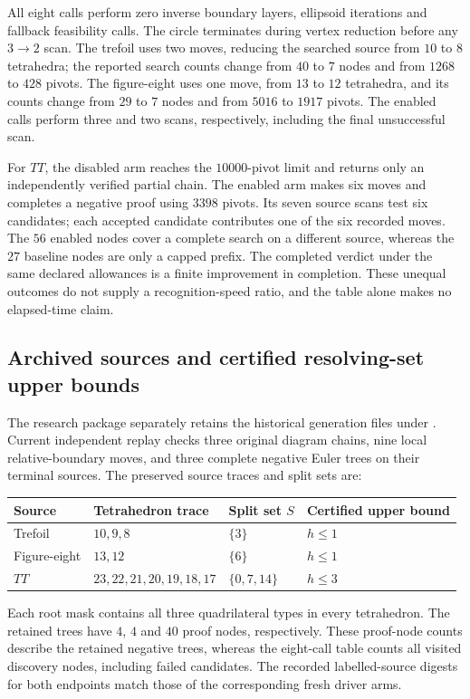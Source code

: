 All eight calls perform zero inverse boundary layers, ellipsoid iterations
and fallback feasibility calls.  The circle terminates during vertex
reduction before any $3\to2$ scan.  The trefoil uses two moves, reducing
the searched source from $10$ to $8$ tetrahedra; the reported search
counts change from $40$ to $7$ nodes and from $1268$ to $428$ pivots.
The figure-eight uses one move, from $13$ to $12$ tetrahedra, and its
counts change from $29$ to $7$ nodes and from $5016$ to $1917$ pivots.
The enabled calls perform three and two scans, respectively, including
the final unsuccessful scan.

For $TT$, the disabled arm reaches the $10000$-pivot limit and returns
only an independently verified partial chain.  The enabled arm makes
six moves and completes a negative proof using $3398$ pivots.  Its seven
source scans test six candidates; each accepted candidate contributes
one of the six recorded moves.  The $56$ enabled nodes cover a complete
search on a different source, whereas the $27$ baseline nodes are only
a capped prefix.  The completed verdict under the same declared
allowances is a finite improvement in completion.  These unequal outcomes
do not supply a recognition-speed ratio, and the table alone makes no
elapsed-time claim.

\subsection{Archived sources and certified resolving-set upper bounds}
\label{sec:strict-pachner32-resolving-bounds}

The research package separately retains the historical generation files
under .  Current
independent replay checks three original diagram chains, nine local
relative-boundary moves, and three complete negative Euler trees on their
terminal sources.  The preserved source traces and split sets are:
\begin{center}\small
\begin{tabular}{llll}
\toprule
Source & Tetrahedron trace & Split set $S$ & Certified upper bound\\
\midrule
Trefoil & $10,9,8$ & $\{3\}$ & $h\le1$\\
Figure-eight & $13,12$ & $\{6\}$ & $h\le1$\\
$TT$ & $23,22,21,20,19,18,17$ & $\{0,7,14\}$ & $h\le3$\\
\bottomrule
\end{tabular}
\end{center}
Each root mask contains all three quadrilateral types in every
tetrahedron.  The retained trees have $4$, $4$ and $40$ proof nodes,
respectively.  These proof-node counts describe the retained negative
trees, whereas the eight-call table counts all visited discovery nodes,
including failed candidates.  The recorded labelled-source digests for
both endpoints match those of the corresponding fresh driver arms.

